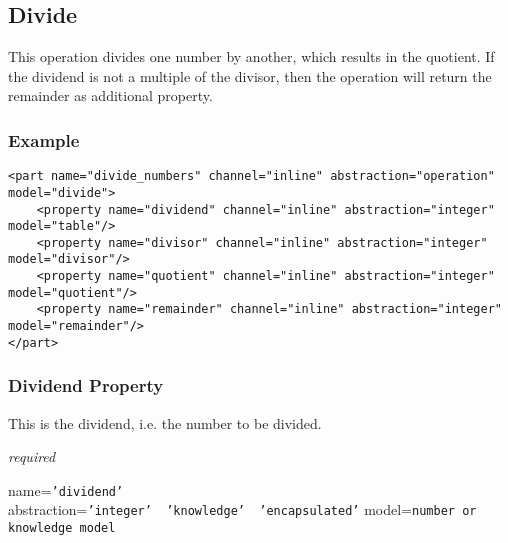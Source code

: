 %
%
%
%
%
%

\subsection{Divide}
\label{divide_heading}

This operation divides one number by another, which results in the quotient. If
the dividend is not a multiple of the divisor, then the operation will return
the remainder as additional property.

\subsubsection{Example}

\begin{scriptsize}
    \begin{verbatim}
<part name="divide_numbers" channel="inline" abstraction="operation" model="divide">
    <property name="dividend" channel="inline" abstraction="integer" model="table"/>
    <property name="divisor" channel="inline" abstraction="integer" model="divisor"/>
    <property name="quotient" channel="inline" abstraction="integer" model="quotient"/>
    <property name="remainder" channel="inline" abstraction="integer" model="remainder"/>
</part>
    \end{verbatim}
\end{scriptsize}

\subsubsection{Dividend Property}

This is the dividend, i.e. the number to be divided.

\emph{required}

name=\texttt{'dividend'}\\
abstraction=\texttt{'integer' \vline\ 'knowledge' \vline\ 'encapsulated'}
model=\texttt{number or knowledge model}

